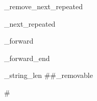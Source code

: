 \documentclass[12pt]{article}
\begin{document}
{%



\rdef \stringify_remove_next_repeated {
	\rcall{}  %
	\putnext{\string} \expandonce
}


\rdef \remove_next_repeated {
	\rcall{}  %
}

\rdef \exp_forward {
	\rcall {}
}

\rdef \exp_forward_end {
	\expandonce
}




\rdef \count_string_len #\container #\known_removable {
	\assertisNtype #\container

}}
\end{document}
